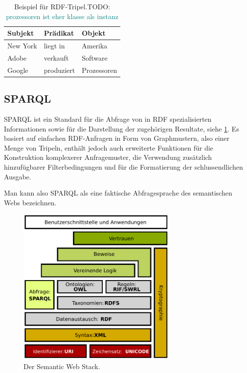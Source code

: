 \documentclass[headsepline,titlepage,ngerman,twoside,12pt]{report}
\newcommand\todo[1]{TODO: \textcolor{teal}{#1}}
\begin{document}
\begin{table}
\begin{centering}
\begin{tabularx}{\textwidth}{XXX}
\toprule
\textrm{Subjekt}			&\textrm{Prädikat}			&\textrm{Objekt}\\
\midrule
New York				&liegt in				&Amerika\\
Adobe				    &verkauft				&Software\\
Google					&produziert				&Prozessoren\\
\bottomrule
\end{tabularx}
\end{centering}
\caption{Beispiel für RDF-Tripel.\todo{prozessoren ist eher klasse als instanz}}
\label{tab:rdfexample}
\end{table}


\subsection{\acs{SPARQL}}
\ac{SPARQL} ist ein Standard für die Abfrage von in \ac{RDF} spezialisierten Informationen sowie für die Darstellung der zugehörigen Resultate, siehe \cref{img:semanticwebstack1}.
Es basiert auf einfachen \ac{RDF}-Anfragen in Form von Graphmustern, also einer Menge von Tripeln, enthält jedoch auch erweiterte Funktionen für die Konstruktion komplexerer Anfragemuster, die Verwendung zusätzlich hinzufügbarer Filterbedingungen und für die Formatierung der schlussendlichen Ausgabe.


Man kann also \ac{SPARQL} als eine faktische Abfragesprache des semantischen Webs bezeichnen.
\begin{figure}
\centering
\includegraphics[width=0.7\textwidth]{images/swebstackde.pdf}
\caption{Der Semantic Web Stack.}
\label{img:semanticwebstack1}

\end{figure}
\end{document}
